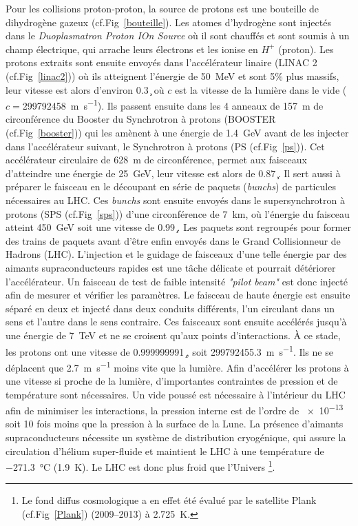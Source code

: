 Pour les collisions proton-proton, la source de protons est une bouteille de dihydrogène gazeux (cf.Fig~\ref{bouteille}). Les atomes d’hydrogène sont injectés dans le \textit{Duoplasmatron Proton IOn Source} où il sont chauffés et sont soumis à un champ électrique, qui arrache leurs électrons et les ionise en $H^{+}$ (proton). Les protons extraits sont ensuite envoyés dans l'accélérateur linaire (LINAC 2 (cf.Fig~\ref{linac2})) où ils atteignent l'énergie de \SI{50}{\mega\eV} et sont \num{5}\% plus massifs, leur vitesse est alors d'environ \SI{0.3}{\c} où $c$ est la vitesse de la lumière dans le vide ($c=$\SI{299 792 458}{\meter\per\second}). Ils passent ensuite dans les \num{4} anneaux de \SI{157}{\meter} de circonférence du Booster du Synchrotron à protons (BOOSTER (cf.Fig~\ref{booster})) qui les amènent à une énergie de \SI{1.4}{\giga\eV} avant de les injecter dans l'accélérateur suivant, le Synchrotron à protons (PS (cf.Fig~\ref{ps})). Cet accélérateur circulaire de \SI{628}{\meter} de circonférence, permet aux faisceaux d'atteindre une énergie de \SI{25}{\giga\eV}, leur vitesse est alors de \SI{0.87}{\c}. Il sert aussi à préparer le faisceau en le découpant en série de paquets (\textit{bunchs}) de particules nécessaires au LHC. Ces \textit{bunchs} sont ensuite envoyés dans le supersynchrotron à protons (SPS (cf.Fig~\ref{sps})) d'une circonférence de \SI{7}{\kilo\meter}, où l'énergie du faisceau atteint \SI{450}{\giga\eV} soit une vitesse de \SI{0.99}{\c}. Les paquets sont regroupés pour former des trains de paquets avant d'être enfin envoyés dans le Grand Collisionneur de Hadrons (LHC). L'injection et le guidage de faisceaux d'une telle énergie par des aimants supraconducteurs rapides est une tâche délicate et pourrait détériorer l'accélérateur. Un faisceau de test de faible intensité \textit{"pilot beam"} est donc injecté afin de mesurer et vérifier les paramètres. Le faisceau de haute énergie est ensuite séparé en deux et injecté dans deux conduits différents, l'un circulant dans un sens et l'autre dans le sens contraire. Ces faisceaux sont ensuite accélérés jusqu'à une énergie de \SI{7}{\tera\eV} et ne se croisent qu'aux points d'interactions. À ce stade, les protons ont une vitesse de \SI{0.999999991}{\c}, soit \SI{299 792 455,3}{\meter\per\second}. Ils ne se déplacent que \SI{2.7}{\meter\per\second} moins vite que la lumière. Afin d'accélérer les protons à une vitesse si proche de la lumière, d'importantes contraintes de pression et de température sont nécessaires. Un vide poussé est nécessaire à l'intérieur du LHC afin de minimiser les interactions, la pression interne est de l'ordre de \SI{e-13}{\atm} soit \num{10} fois moins que la pression à la surface de la Lune. La présence d'aimants supraconducteurs nécessite un système de distribution cryogénique, qui assure la circulation d'hélium super-fluide et maintient le LHC à une température de \SI{-271,3}{\celsius} (\SI{1.9}{\kelvin}). Le LHC est donc plus froid que l'Univers \footnote{Le fond diffus cosmologique a en effet été évalué par le satellite Plank (cf.Fig~\ref{Plank}) (\num{2009}--\num{2013}) à \SI{2,725}{\kelvin}.}.


